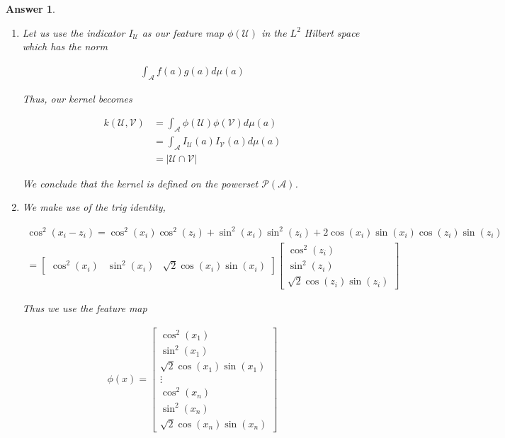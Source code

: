 \documentclass[12pt]{article}
\theoremstyle{colon}
\newtheorem*{answer}{Answer}
\begin{document}
\begin{answer}
  \

  \begin{enumerate}[label=\alph*)]
    \item Let us use the indicator $I_{\mathcal{U}}$ as our feature map $\phi(\mathcal{U})$ in the $L^2$ Hilbert space which has the norm

      \begin{gather*}
        \int_{\mathcal{A}} f(a) g(a) d \mu(a)
      \end{gather*}

      Thus, our kernel becomes

      \begin{align*}
        k(\mathcal{U}, \mathcal{V}) &= \int_{\mathcal{A}} \phi(\mathcal{U}) \phi(\mathcal{V}) d \mu(a) \\
        &= \int_{\mathcal{A}} I_{\mathcal{U}} (a) I_{\mathcal{V}} (a) d \mu(a) \\
        &= \lvert \mathcal{U} \cap \mathcal{V} \rvert
      \end{align*}

      We conclude that the kernel is defined on the powerset $\mathcal{P}(\mathcal{A})$.


    \item We make use of the trig identity,

      \begin{gather*}
        \cos^2 (x_i - z_i) = \cos^2(x_i) \cos^2(z_i) + \sin^2(x_i) \sin^2(z_i) + 2 \cos(x_i)\sin(x_i)\cos(z_i)\sin(z_i) \\
        = \begin{bmatrix}
          \cos^2(x_i) & \sin^2(x_i) & \sqrt{2}\cos(x_i)\sin(x_i)
        \end{bmatrix} \begin{bmatrix}
          \cos^2(z_i) \\ \sin^2(z_i) \\ \sqrt{2}\cos(z_i)\sin(z_i)
        \end{bmatrix}
      \end{gather*}

      Thus we use the feature map

      \begin{gather*}
        \phi(x) = \begin{bmatrix}
          \cos^2(x_1) \\ \sin^2(x_1) \\ \sqrt{2}\cos(x_1)\sin(x_1) \\ \vdots \\ \cos^2(x_n) \\ \sin^2(x_n) \\ \sqrt{2}\cos(x_n)\sin(x_n)
        \end{bmatrix}
      \end{gather*}


\end{enumerate}
\end{answer}
\end{document}
